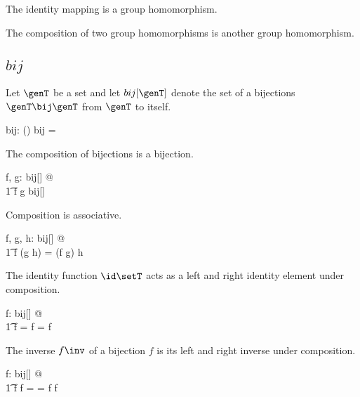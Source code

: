 \documentclass{amsart}
\begin{document}
\begin{remark}
The identity mapping is a group homomorphism.
\end{remark}

\begin{remark}
The composition of two group homomorphisms is another group homomorphism.
\end{remark}

\subsection{$bij$}

Let $\genT$ be a set and let $bij[\genT]$ denote the set of a bijections $\genT \bij \genT$ from $\genT$ to itself.

\begin{gendef}[\genT]
	bij: \power (\genT \fun \genT)
\where
	bij = \genT \bij \genT
\end{gendef}

\begin{remark}
The composition of bijections is a bijection.

\begin{zed}
	\forall f, g: bij[\setT] @ \\
	\t1	f \circ g \in bij[\setT]
\end{zed}

\end{remark}

\begin{remark}
Composition is associative.

\begin{zed}
	\forall f, g, h: bij[\setT] @ \\
	\t1	f \circ (g \circ h) = (f \circ g) \circ h
\end{zed}

\end{remark}

\begin{remark}
The identity function $\id \setT$ acts as a left and right identity element under composition.

\begin{zed}
	\forall f: bij[\setT] @ \\
	\t1	 \id \setT \circ f = f = f \circ \id \setT
\end{zed}

\end{remark}

\begin{remark}
The inverse $f \inv$ of a bijection $f$ is its left and right inverse under composition.

\begin{zed}
	\forall f: bij[\setT] @ \\
	\t1	f \circ f \inv = \id \setT = f \inv \circ f
\end{zed}

\end{remark}
\end{document}
